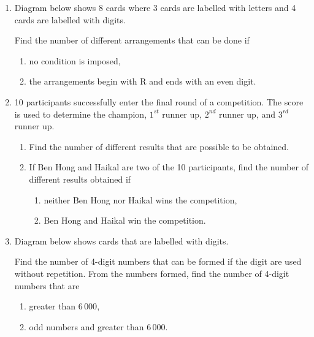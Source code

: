 \documentclass{report}
\begin{document}
\begin{multicols*}{2}
\begin{enumerate}
            \item Diagram below shows 8 cards where 3 cards are labelled with letters and 4 cards
                  are labelled with digits.

                  Find the number of different arrangements that can be done if
                  \begin{enumerate}
                        \item no condition is imposed,
                        \item the arrangements begin with R and ends with an even digit.
                  \end{enumerate}

            \item 10 participants successfully enter the final round of a competition. The score is used to determine the champion, $1^{st}$ runner up, $2^{nd}$ runner up, and $3^{rd}$ runner up.
                  \begin{enumerate}
                        \item Find the number of different results that are possible to be obtained.
                        \item If Ben Hong and Haikal are two of the 10 participants, find the number of
                              different results obtained if
                              \begin{enumerate}
                                    \item neither Ben Hong nor Haikal wins the competition,
                                    \item Ben Hong and Haikal win the competition.
                              \end{enumerate}
                  \end{enumerate}

            \item Diagram below shows cards that are labelled with digits.

                  Find the number of 4-digit numbers that can be formed if the digit are used
                  without repetition. From the numbers formed, find the number of 4-digit numbers
                  that are
                  \begin{enumerate}
                        \item greater than $6\,000$,
                        \item odd numbers and greater than $6\,000$.
                  \end{enumerate}


\end{enumerate}
\end{multicols*}
\end{document}
